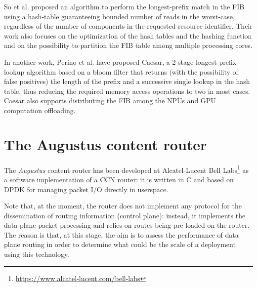 \documentclass[12pt,a4paper,twoside]{book}
\begin{document}
So et al.\cite{ndn_fast_dosresistant} proposed an algorithm to perform the longest-prefix match in the \gls{FIB} using a hash-table guaranteeing bounded number of reads in the worst-case, regardless of the number of components in the requested resource identifier. Their work also focuses on the optimization of the hash tables and the hashing function and on the possibility to partition the \gls{FIB} table among multiple processing cores.

In another work, Perino et al.\cite{caesar} have proposed Caesar, a 2-stage longest-prefix lookup algorithm based on a bloom filter that returns (with the possibility of false positives) the length of the prefix and a successive single lookup in the hash table, thus reducing the required memory access operations to two in most cases. Caesar also supports distributing the \gls{FIB} among the NPUs and GPU computation offloading.




\chapter{The Augustus content router}
\label{chap:augustus}

The \textit{Augustus} content router has been developed at Alcatel-Lucent Bell Labs\footnote{\url{https://www.alcatel-lucent.com/bell-labs}} as a software implementation of a \gls{CCN} router:
it is written in C and based on DPDK \cite{dpdk} for managing packet I/O directly in userspace.

Note that, at the moment, the router does not implement any protocol for the dissemination of routing information (control plane): instead, it implements the data plane packet processing and relies on routes being pre-loaded on the router. The reason is that, at this stage, the aim is to assess the performance of data plane routing in order to determine what could be the scale of a deployment using this technology.
\end{document}
